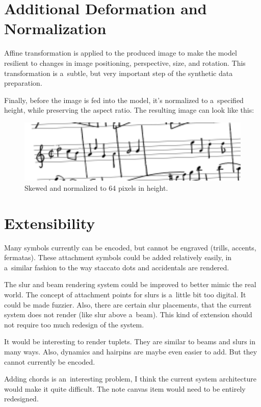 \section{Additional Deformation and Normalization}

Affine transformation is applied to the produced image to make the model resilient to changes in image positioning, perspective, size, and rotation. This transformation is a~subtle, but very important step of the synthetic data preparation.

Finally, before the image is fed into the model, it's normalized to a~specified height, while preserving the aspect ratio. The resulting image can look like this:

\begin{figure}[h]
    \centering
    \includegraphics[width=120mm]{../img/normalized-image}
    \caption{Skewed and normalized to 64 pixels in height.}
    \label{fig5:NormalizedImage}
\end{figure}


\section{Extensibility}

Many symbols currently can be encoded, but cannot be engraved (trills, accents, fermatas). These attachment symbols could be added relatively easily, in a~similar fashion to the way staccato dots and accidentals are rendered.

The slur and beam rendering system could be improved to better mimic the real world. The concept of attachment points for slurs is a~little bit too digital. It could be made fuzzier. Also, there are certain slur placements, that the current system does not render (like slur above a~beam). This kind of extension should not require too much redesign of the system.

It would be interesting to render tuplets. They are similar to beams and slurs in many ways. Also, dynamics and hairpins are maybe even easier to add. But they cannot currently be encoded.

Adding chords is an~interesting problem, I think the current system architecture would make it quite difficult. The note canvas item would need to be entirely redesigned.
